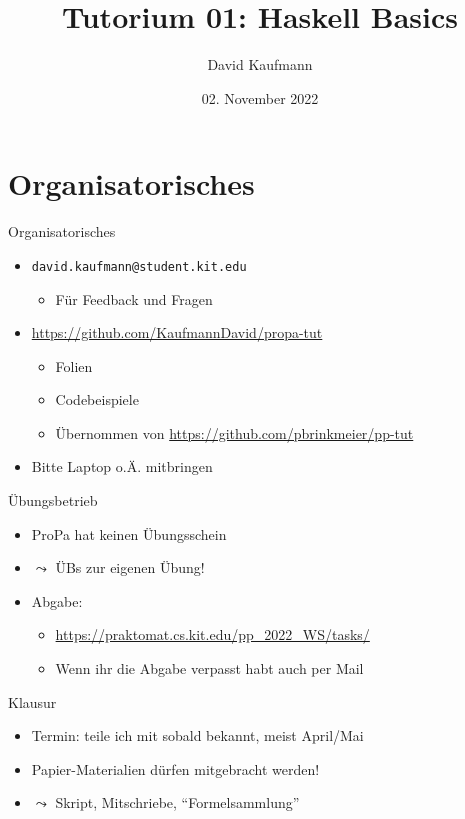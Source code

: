 \documentclass{beamer}
\title{Tutorium 01: Haskell Basics}
\author{David Kaufmann}
\institute{Tutorium Programmierparadigmen am KIT}
\date{02. November 2022}
\begin{document}
\begin{frame}
        \titlepage
\end{frame}

\section{Organisatorisches}

\begin{frame}{Organisatorisches}
        \begin{itemize}
                \item \texttt{david.kaufmann@student.kit.edu}
                \begin{itemize}
                        \item Für Feedback und Fragen
                \end{itemize}
                \item \url{https://github.com/KaufmannDavid/propa-tut}
                \begin{itemize}
                        \item Folien
                        \item Codebeispiele
                        \item Übernommen von \url{https://github.com/pbrinkmeier/pp-tut}
                \end{itemize}
                \item Bitte Laptop o.Ä. mitbringen
        \end{itemize}
\end{frame}

\begin{frame}{Übungsbetrieb}
        \begin{itemize}
                \item ProPa hat keinen Übungsschein
                \item $\leadsto$ ÜBs zur eigenen Übung!
                \item Abgabe:
                \begin{itemize}
                  \item \url{https://praktomat.cs.kit.edu/pp_2022_WS/tasks/}
                  \item Wenn ihr die Abgabe verpasst habt auch per Mail
                \end{itemize}
        \end{itemize}
\end{frame}

\begin{frame}{Klausur}
        \begin{itemize}
                \item Termin: teile ich mit sobald bekannt, meist April/Mai
                \item Papier-Materialien dürfen mitgebracht werden!
                \item $\leadsto$ Skript, Mitschriebe, \enquote{Formelsammlung}
        \end{itemize}
\end{frame}
\end{document}
